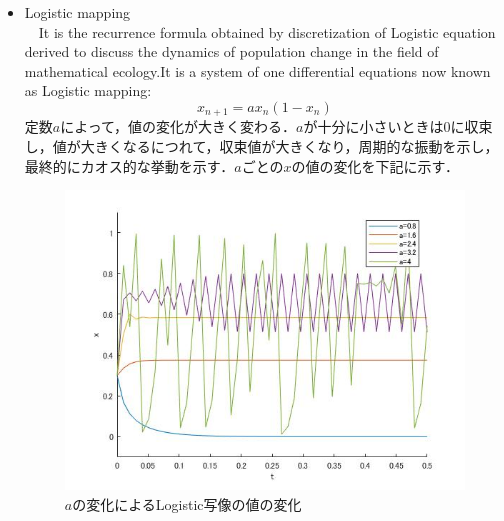 \documentclass[autodetect-engine,dvipdfmx-if-dvi,ja=standard,a4paper,11pt]{bxjsarticle} %
\begin{document}
\begin{itemize}
\item Logistic mapping\\%
　It is the recurrence formula obtained by discretization of Logistic equation derived to discuss the dynamics of population change in the field of mathematical ecology\cite{lo}.It is a system of one differential equations now known as Logistic mapping:
\begin{equation}
x_{n+1}=ax_{n}(1-x_{n})
\end{equation}
定数$a$によって，値の変化が大きく変わる．$a$が十分に小さいときは0に収束し，値が大きくなるにつれて，収束値が大きくなり，周期的な振動を示し，最終的にカオス的な挙動を示す．$a$ごとの$x$の値の変化を下記に示す．

\begin{figure}[H]%
\begin{center}
\includegraphics[width=.4\textwidth]{Logistic_result.jpg}
\end{center}
\caption{$a$の変化によるLogistic写像の値の変化}%
\label{fig:logstic}
\end{figure}



\end{itemize}
\end{document}
